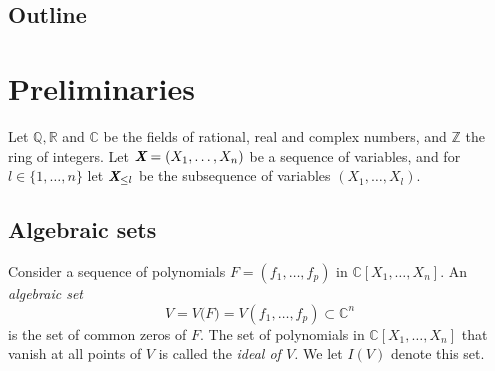 \documentclass[a4paper]{article}
\def\Xb{\textit{\textbf{X}}}
\newcommand{\ZZ}{{\mathbb{Z}}}
\def\C{\mathbb{C}}
\def\Q{\mathbb{Q}}
\def\R{\mathbb{R}}
\begin{document}
\subsection{Outline}



















\section{Preliminaries}
Let $\Q, \R$ and $\C$ be the fields of rational, real and complex numbers, and $\ZZ$ the ring of integers. Let $\Xb = (X_1, \hdots , X_n)$ be a sequence of variables, and for $l \in \{1,\hdots,n\}$ let $\Xb_{\leq l}$ be the subsequence of variables $(X_1, \hdots , X_l)$.



\subsection{Algebraic sets} 
Consider a sequence of polynomials $F=(f_1,\hdots,f_p)$ in $\C[X_1,\hdots,X_n].$
An \textit{algebraic set} 
\[
V = V\big(F) = V(f_1,\hdots,f_p) \subset \C^n
\]
is the set of common zeros of $F$.  The set of polynomials in $\C[X_1,\hdots, X_n]$ that vanish at all points of $V$ is called the \textit{ideal of $V$.} We let $I(V)$ denote this set.
%
\end{document}
